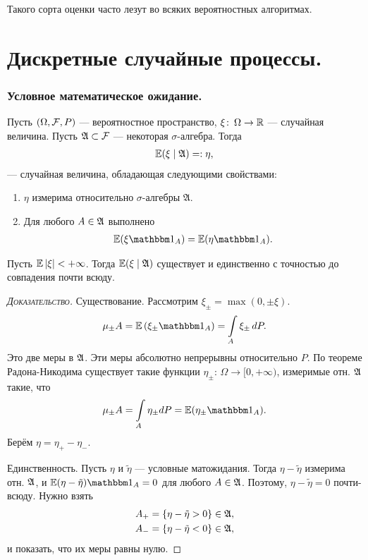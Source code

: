 \documentclass[../main.tex]{subfiles}
\begin{document}
Такого сорта оценки часто лезут во всяких вероятностных алгоритмах.

\newpage
\part{Дискретные случайные процессы.}
\section{Условное математическое ожидание.}
\begin{df}
 Пусть $ (\Omega, \mathcal F, P) $ --- вероятностное пространство, $ \xi \colon \, \Omega \to \mathbb{R} $ --- случайная величина. Пусть $ \mathfrak A \subset \mathcal F $ --- некоторая $ \sigma $-алгебра. Тогда
 \begin{align*}
  \mathbb E(\xi \mid \mathfrak A) =: \eta,
 \end{align*} --- случайная величина, обладающая следующими свойствами:
 \begin{enumerate}
  \item $ \eta $ измерима относительно $ \sigma $-алгебры $ \mathfrak A $.
  \item Для любого $ A \in \mathfrak A $ выполнено
   \begin{align*}
    \E(\xi \Ind_A) = \E(\eta \Ind_A).
   \end{align*}
 \end{enumerate}
\end{df}
\begin{thm}
 Пусть $ \mathbb E \left| \xi \right| < +\infty $. Тогда $ \mathbb E(\xi\mid\mathfrak A) $ существует и единственно с точностью до совпадения почти всюду.
\end{thm}
\begin{proof}[\normalfont\textsc{Доказательство}]
 Существование. Рассмотрим $ \xi_\pm = \max(0, \pm \xi) $.
 \begin{align*}
  \mu_\pm A = \E \left( \xi_\pm \Ind_A \right) = \int\limits_{A} \xi_\pm \,dP. 
 \end{align*} Это две меры в $ \mathfrak A $. Эти меры абсолютно непрерывны относительно $ P $. По теореме Радона-Никодима существует такие функции $ \eta_\pm \colon\, \Omega \to [0, +\infty)  $, измеримые отн. $ \mathfrak A $ такие, что
 \begin{align*}
  \mu_\pm A = \int\limits_{A} \eta_\pm dP = \E (\eta_\pm \Ind_A).
 \end{align*} Берём $ \eta = \eta_+ - \eta_- $.

 Единственность. Пусть $ \eta  $ и $ \tilde \eta $ --- условные матожидания. Тогда
 $ \eta - \tilde \eta $ измерима отн. $ \mathfrak A $, и $ \E(\eta-\tilde\eta) \Ind_A = 0 $ для любого $ A \in \mathfrak A $. Поэтому, $ \eta - \tilde\eta = 0 $ почти-всюду. Нужно взять
 \begin{align*}
  A_+ &= \left\{ \eta - \tilde\eta > 0 \right\} \in \mathfrak A, \\
  A_- &= \left\{ \eta - \tilde\eta < 0 \right\} \in \mathfrak A,
 \end{align*} и показать, что их меры равны нулю.
\end{proof}
\end{document}
